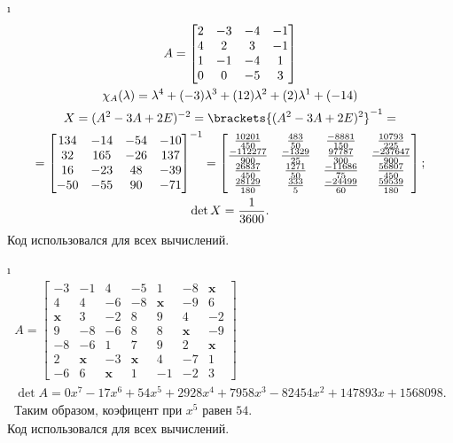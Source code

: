\i
\begin{gather*}
    A = \begin{bmatrix}
        2 & -3 & -4 & -1\\
        4 & 2 & 3 & -1\\
        1 & -1 & -4 & 1\\
        0 & 0 & -5 & 3\\
    \end{bmatrix}\\
    \chi_A(\lambda) = \lambda^4 + (-3)\lambda^3 + (12)\lambda^2 + (2)\lambda^1 + (-14)\\
    X = (A^2 -3A + 2E)^{-2} = \brackets{(A^2 - 3A + 2E)^2}^{-1} = \\
    = \begin{bmatrix}
        134 & -14 & -54 & -10\\
        32 & 165 & -26 & 137\\
        16 & -23 & 48 & -39\\
        -50 & -55 & 90 & -71
      \end{bmatrix}^{-1} = \begin{bmatrix}
        \frac{10201}{450} & \frac{483}{50} & \frac{-8881}{150} & \frac{10793}{225}\\
        \frac{-112277}{900} & \frac{-1329}{25} & \frac{97787}{300} & \frac{-237647}{900}\\
        \frac{26837}{450} & \frac{1271}{50} & \frac{-11686}{75} & \frac{56807}{450}\\
        \frac{28129}{180} & \frac{333}{5} & \frac{-24499}{60} & \frac{59539}{180}
      \end{bmatrix};\\
      \det X = \frac{1}{3600}.
\end{gather*}
Код использовался для всех вычислений.

\i
\begin{gather*}
    A = 
    \begin{bmatrix}
        -3 & -1 & 4 & -5 & 1 & -8 & \textbf{x}\\
        4 & 4 & -6 & -8 & \textbf{x} & -9 & 6\\
        \textbf{x} & 3 & -2 & 8 & 9 & 4 & -2\\
        9 & -8 & -6 & 8 & 8 & \textbf{x} & -9\\
        -8 & -6 & 1 & 7 & 9 & 2 & \textbf{x}\\
        2 & \textbf{x} & -3 & \textbf{x} & 4 & -7 & 1\\
        -6 & 6 & \textbf{x} & 1 & -1 & -2 & 3
    \end{bmatrix}\\
    \det A = 0x^7 - 17x^6 + 54x^5 + 2928x^4 + 7958x^3 - 82454x^2 + 147893x + 1568098.\\
    \text{Таким образом, коэфицент при $x^5$ равен } 54.
\end{gather*}
Код использовался для всех вычислений.

